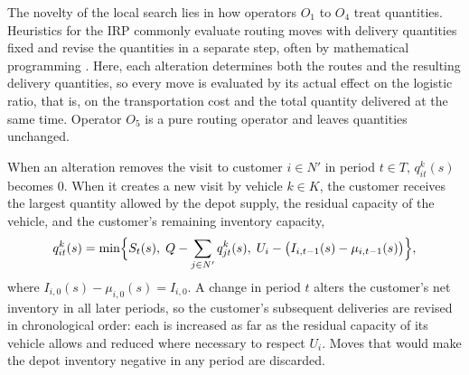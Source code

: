 \documentclass{article}
\begin{document}
The novelty of the local search lies in how operators $O_1$ to $O_4$ treat quantities. Heuristics for the IRP commonly evaluate routing moves with delivery quantities fixed and revise the quantities in a separate step, often by mathematical programming \citep{iswari2026extending}. Here, each alteration determines both the routes and the resulting delivery quantities, so every move is evaluated by its actual effect on the logistic ratio, that is, on the transportation cost and the total quantity delivered at the same time. Operator $O_5$ is a pure routing operator and leaves quantities unchanged.

When an alteration removes the visit to customer $i\in N'$ in period $t\in T$, $q^k_{it}(s)$ becomes 0. When it creates a new visit by vehicle $k\in K$, the customer receives the largest quantity allowed by the depot supply, the residual capacity of the vehicle, and the customer's remaining inventory capacity,
\begin{equation}
   q^k_{it}(s) = \min\Bigl\{S_t(s),\; Q - \sum_{j\in N'}q^k_{jt}(s),\; U_i-\bigl(I_{i,t-1}(s)-\mu_{i,t-1}(s)\bigr)\Bigr\},\label{Adjust quantity}
\end{equation}
where $I_{i,0}(s)-\mu_{i,0}(s)=I_{i,0}$. A change in period $t$ alters the customer's net inventory in all later periods, so the customer's subsequent deliveries are revised in chronological order: each is increased as far as the residual capacity of its vehicle allows and reduced where necessary to respect $U_i$. Moves that would make the depot inventory negative in any period are discarded.
\end{document}
